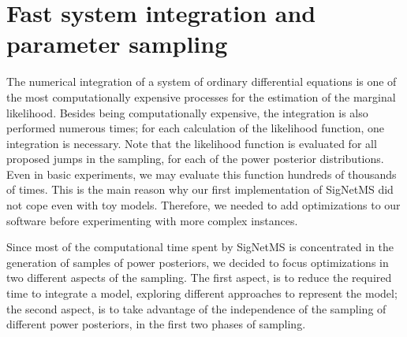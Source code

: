 \section{Fast system integration and parameter sampling}
%   
The numerical integration of a system of ordinary differential equations
is one of the most computationally expensive processes for the
estimation of the marginal likelihood. Besides being computationally
expensive, the integration is also performed numerous times; for each
calculation of the likelihood function, one integration is necessary.
Note that the likelihood function is evaluated for all proposed jumps in
the sampling, for each of the power posterior distributions. Even in
basic experiments, we may evaluate this function hundreds of thousands
of times. This is the main reason why our first implementation of 
SigNetMS did not cope even with toy models. Therefore, we needed to add
optimizations to our software before experimenting with more complex
instances.

Since most of the computational time spent by SigNetMS is concentrated
in the generation of samples of power posteriors, we decided to focus
optimizations in two different aspects of the sampling. The first
aspect, is to reduce the required time to integrate a model, exploring
different approaches to represent the model; the second aspect, is to
take advantage of the independence of the sampling of different
power posteriors, in the first two phases of sampling.

